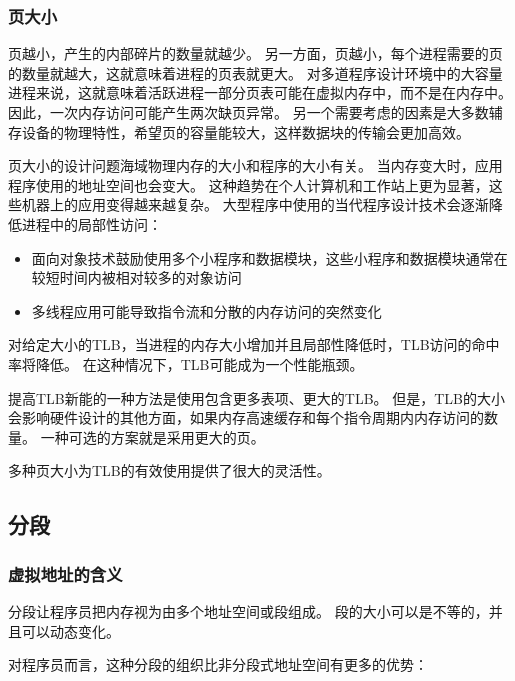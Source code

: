 {{        \subsubsection{页大小}
        {
            页越小，产生的内部碎片的数量就越少。
            另一方面，页越小，每个进程需要的页的数量就越大，这就意味着进程的页表就更大。
            对多道程序设计环境中的大容量进程来说，这就意味着活跃进程一部分页表可能在虚拟内存中，而不是在内存中。
            因此，一次内存访问可能产生两次缺页异常。
            另一个需要考虑的因素是大多数辅存设备的物理特性，希望页的容量能较大，这样数据块的传输会更加高效。

            页大小的设计问题海域物理内存的大小和程序的大小有关。
            当内存变大时，应用程序使用的地址空间也会变大。
            这种趋势在个人计算机和工作站上更为显著，这些机器上的应用变得越来越复杂。
            大型程序中使用的当代程序设计技术会逐渐降低进程中的局部性访问：

            \begin{itemize}
                \item 面向对象技术鼓励使用多个小程序和数据模块，这些小程序和数据模块通常在较短时间内被相对较多的对象访问
                \item 多线程应用可能导致指令流和分散的内存访问的突然变化
            \end{itemize}

            对给定大小的TLB，当进程的内存大小增加并且局部性降低时，TLB访问的命中率将降低。
            在这种情况下，TLB可能成为一个性能瓶颈。

            提高TLB新能的一种方法是使用包含更多表项、更大的TLB。
            但是，TLB的大小会影响硬件设计的其他方面，如果内存高速缓存和每个指令周期内内存访问的数量。
            一种可选的方案就是采用更大的页。

            多种页大小为TLB的有效使用提供了很大的灵活性。
        }
    }

    \subsection{分段}
    {
        \subsubsection{虚拟地址的含义}
        {
            分段让程序员把内存视为由多个地址空间或段组成。
            段的大小可以是不等的，并且可以动态变化。

            对程序员而言，这种分段的组织比非分段式地址空间有更多的优势：

}}}
